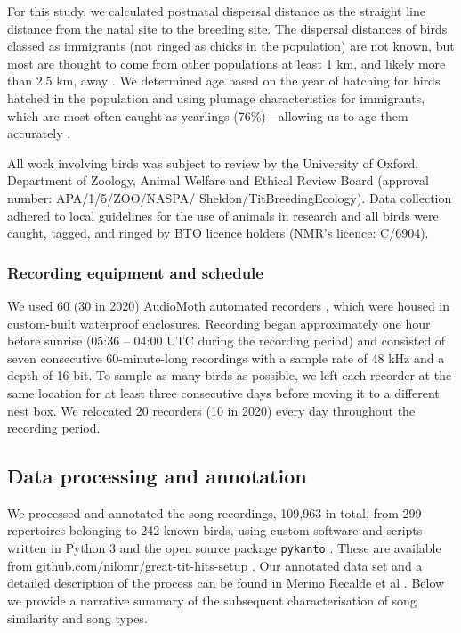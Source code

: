 \documentclass[9pt, onecolumn, twoside, lineno]{gsajnl}
\begin{document}
For this study, we calculated postnatal dispersal distance as the straight line distance from the natal site to the breeding site. The dispersal distances of birds classed as immigrants (not ringed as chicks in the population) are not known, but most are thought to come from other populations at least 1 km, and likely more than 2.5 km, away \autocite{verhulst1997, quinn2011}. We determined age based on the year of hatching for birds hatched in the population and using plumage characteristics for immigrants, which are most often caught as yearlings (76\%)---allowing us to age them accurately \autocite{woodman2023}.

All work involving birds was subject to review by the University of Oxford, Department of Zoology, Animal Welfare and Ethical Review Board (approval number: APA/1/5/ZOO/NASPA/ Sheldon/TitBreedingEcology). Data collection adhered to local guidelines for the use of animals in research and all birds were caught, tagged, and ringed by BTO licence holders (NMR's licence: C/6904).

\subsubsection{Recording equipment and schedule}
We used 60 (30 in 2020) AudioMoth automated recorders \autocite{hill2019}, which were housed in custom-built waterproof enclosures. Recording began approximately one hour before sunrise (05:36 -- 04:00 UTC during the recording period) and consisted of seven consecutive 60-minute-long recordings with a sample rate of 48 kHz and a depth of 16-bit. To sample as many birds as possible, we left each recorder at the same location for at least three consecutive days before moving it to a different nest box. We relocated 20 recorders (10 in 2020) every day throughout the recording period.

\subsection{Data processing and annotation}

We processed and annotated the song recordings, 109,963 in total, from 299 repertoires belonging to 242 known birds, using custom software and scripts written in Python 3 \autocite{vanrossum1995} and the open source package \texttt{pykanto} \autocite{merinorecalde2023}. These are available from \href{https://github.com/nilomr/great-tit-hits-setup}{github.com/nilomr/great-tit-hits-setup} \autocite{nilo_gretidata set_setup_2023}. Our annotated data set and a detailed description of the process can be found in Merino Recalde et al \autocite{merinorecalde2023a}. Below we provide a narrative summary of the subsequent characterisation of song similarity and song types.
\end{document}
